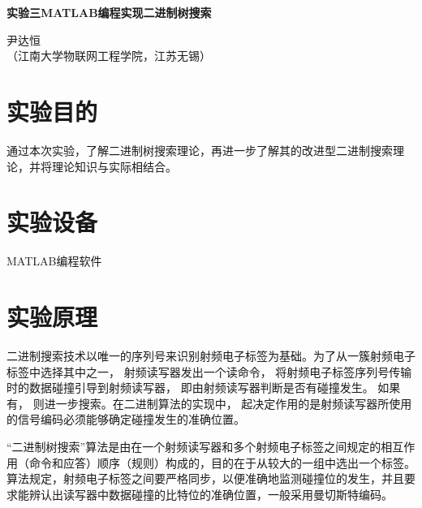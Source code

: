 \documentclass[a4paper]{ctexart}
\begin{document}
\begin{center}
	{\textbf{实验三\quad MATLAB编程实现二进制树搜索}}

	{尹达恒}\\[-1mm]

	{（江南大学物联网工程学院，江苏\quad 无锡）}
\end{center}

\renewcommand{\baselinestretch}{1.3}
\section{实验目的}
通过本次实验，了解二进制树搜索理论，再进一步了解其的改进型二进制搜索理论，并将理论知识与实际相结合。

\section{实验设备}
MATLAB编程软件

\section{实验原理}\label{实验原理}
二进制搜索技术以唯一的序列号来识别射频电子标签为基础。为了从一簇射频电子标签中选择其中之一， 射频读写器发出一个读命令， 将射频电子标签序列号传输时的数据碰撞引导到射频读写器， 即由射频读写器判断是否有碰撞发生。 如果有， 则进一步搜索。在二进制算法的实现中， 起决定作用的是射频读写器所使用的信号编码必须能够确定碰撞发生的准确位置。

“二进制树搜索”算法是由在一个射频读写器和多个射频电子标签之间规定的相互作用（命令和应答）顺序（规则）构成的，目的在于从较大的一组中选出一个标签。算法规定，射频电子标签之间要严格同步，以便准确地监测碰撞位的发生，并且要求能辨认出读写器中数据碰撞的比特位的准确位置，一般采用曼切斯特编码。
\end{document}

